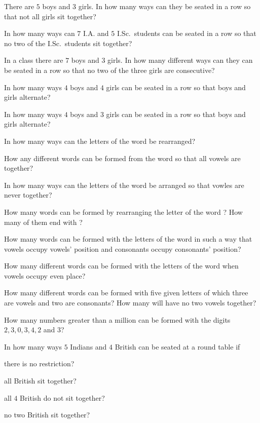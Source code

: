\item There are $5$ boys and $3$ girls. In how many ways can they be seated in a row so that not all girls sit together?
\item In how many ways can $7$ I.A. and $5$ I.Sc.\ students can be seated in a row so that no two of the I.Sc.\ students sit
  together?
\item In a class there are $7$ boys and $3$ girls. In how many different ways can they can be seated in a row so that no two of the
  three girls are consecutive?
\item In how many ways $4$ boys and $4$ girls can be seated in a row so that boys and girls alternate?
\item In how many ways $4$ boys and $3$ girls can be seated in a row so that boys and girls alternate?
\item In how many ways can the letters of the word  be rearranged?
\item How any different words can be formed from the word  so that all vowels are together?
\item In how many ways can the letters of the word  be arranged so that vowles are never together?
\item How many words can be formed by rearranging the letter of the word ? How many of them end with ?
\item How many words can be formed with the letters of the word  in such a way that vowels occupy vowels' position
  and consonants occupy consonants' position?
\item How many different words can be formed with the letters of the word  when vowels occupy even place?
\item How many different words can be formed with five given letters of which three are vowels and two are consonants? How many will
  have no two vowels together?
\item How many numbers greater than a million can be formed with the digits $2, 3, 0, 3, 4, 2$ and $3$?
\item In how many ways $5$ Indians and $4$ British can be seated at a round table if
  \startitemize[i]
    \item there is no restriction?
    \item all British sit together?
    \item all $4$ British do not sit together?
    \item no two British sit together?
